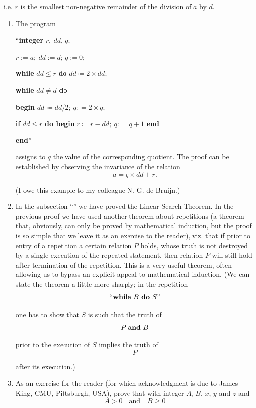 \noindent
i.e. $r$ is the smallest non-negative remainder of the division of $a$ by $d$.

\begin{enumerate}[wide, nosep, label=\textit{Remark }\arabic*.]
	\item The program
	
	{
		\setlength{\parindent}{8em}
		\hspace{-.4em}``\textbf{integer} $r,\ dd,\ q;$
		
		$r:= a;\ dd:= d;\ q:= 0;$
		
		\textbf{while} $dd \leqslant r$ \textbf{do} $dd \coloneq 2 \times dd;$
		
		\textbf{while} $dd \neq d$ \textbf{do}
		
		\quad\textbf{begin} $dd \coloneq dd/2;\ q: = 2 \times q;$
		
		\quad\quad\textbf{if} $dd \leqslant r$ \textbf{do begin} $r \coloneq r - dd;\ q: = q + 1$ \textbf{end}
		
		\quad\textbf{end}''
	}
	
\noindent
assigns to $q$ the value of the corresponding quotient. The proof can be established by observing the invariance of the relation
	$$
	a= q \times dd + r.
	$$
	
	(I owe this example to my colleague N. G. de Bruijn.)

	\item In the subsection ``'' we have proved the Linear Search Theorem. In the previous proof we have used another theorem about repetitions (a theorem that, obviously, can only be proved by mathematical induction, but the proof is so simple that we leave it as an exercise to the reader), viz. that if prior to entry of a repetition a certain relation $P$ holds, whose truth is not destroyed by a single execution of the repeated statement, then relation $P$ will still hold after termination of the repetition. This is a very useful theorem, often allowing us to bypass an explicit appeal to mathematical induction. (We can state the theorem a little more sharply; in the repetition
	$$
		\text{``\textbf{while} } B \text{ \textbf{do} } S\text{''}
	$$	
	
	\noindent
	one has to show that $S$ is such that the truth of
	$$
	P \text{ \textbf{and} } B
	$$
	
	\noindent
	prior to the execution of $S$ implies the truth of
	$$ P $$
	
	\noindent
	after its execution.)
	\item As an exercise for the reader (for which acknowledgment is due to James King, CMU, Pittsburgh, USA), prove that with integer $A$, $B$, $x$, $y$ and $z$ and
	$$
	A > 0\quad \text{and}\quad B\geqslant 0
	$$
	

\end{enumerate}
